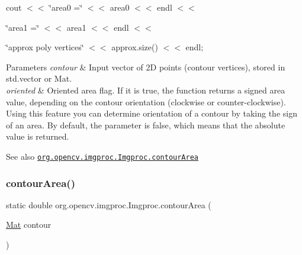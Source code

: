{\ttfamily cout $<$$<$ \char`\"{}area0 =\char`\"{} $<$$<$ area0 $<$$<$ endl $<$$<$}

{\ttfamily }

{\ttfamily }

{\ttfamily \char`\"{}area1 =\char`\"{} $<$$<$ area1 $<$$<$ endl $<$$<$}

{\ttfamily }

{\ttfamily }

{\ttfamily \char`\"{}approx poly vertices\char`\"{} $<$$<$ approx.\+size() $<$$<$ endl;}

{\ttfamily }

{\ttfamily 
\begin{DoxyParams}{Parameters}
{\em contour} & Input vector of 2D points (contour vertices), stored in {\ttfamily std.\+vector} or {\ttfamily Mat}. \\
\hline
{\em oriented} & Oriented area flag. If it is true, the function returns a signed area value, depending on the contour orientation (clockwise or counter-\/clockwise). Using this feature you can determine orientation of a contour by taking the sign of an area. By default, the parameter is {\ttfamily false}, which means that the absolute value is returned.\\
\hline
\end{DoxyParams}
\begin{DoxySeeAlso}{See also}
\href{http://docs.opencv.org/modules/imgproc/doc/structural_analysis_and_shape_descriptors.html#contourarea}{\tt org.\+opencv.\+imgproc.\+Imgproc.\+contour\+Area} 
\end{DoxySeeAlso}
}\mbox{\label{classorg_1_1opencv_1_1imgproc_1_1_imgproc_a9d6a5977b0691eb9736af8151e2bbc61}} 
\subsubsection{\texorpdfstring{contour\+Area()}{contourArea()}\hspace{0.1cm}{\footnotesize\ttfamily [2/2]}}
{\footnotesize\ttfamily static double org.\+opencv.\+imgproc.\+Imgproc.\+contour\+Area (\begin{DoxyParamCaption}\item[{\mbox{\hyperlink{classorg_1_1opencv_1_1core_1_1_mat}{Mat}}}]{contour }\end{DoxyParamCaption})\hspace{0.3cm}{\ttfamily [static]}}

